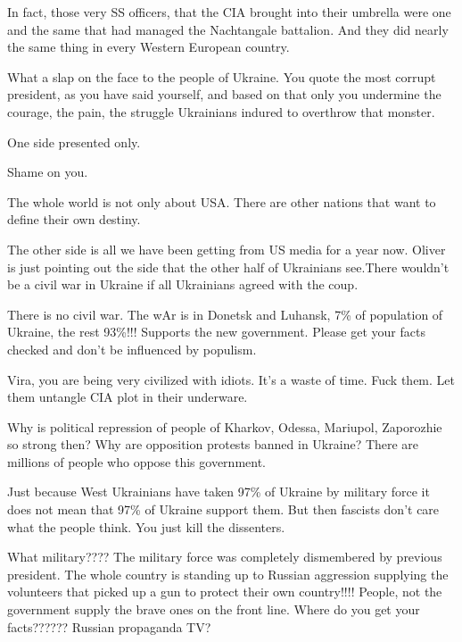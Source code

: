 \begin{itemize}
\begin{itemize}
In fact, those very SS officers, that the CIA brought into their umbrella were
one and the same that had managed the Nachtangale battalion. And they did
nearly the same thing in every Western European country.


\end{itemize} %


What a slap on the face to the people of Ukraine. You quote the most corrupt
president, as you have said yourself, and based on that only you undermine the
courage, the pain, the struggle Ukrainians indured to overthrow that monster.

One side presented only.

Shame on you.

The whole world is not only about USA. There are other nations that want to
define their own destiny.

\begin{itemize} %

The other side is all we have been getting from US media for a year now. Oliver
is just pointing out the side that the other half of Ukrainians see.There
wouldn't be a civil war in Ukraine if all Ukrainians agreed with the coup.



There is no civil war. The wAr is in Donetsk and Luhansk, 7\% of population of
Ukraine, the rest 93\%!!! Supports the new government. Please get your facts
checked and don't be influenced by populism.


Vira, you are being very civilized with idiots. It's a waste of time. Fuck
them. Let them untangle CIA plot in their underware.


Why is political repression of people of Kharkov, Odessa, Mariupol, Zaporozhie
so strong then? Why are opposition protests banned in Ukraine? There are
millions of people who oppose this government.


Just because West Ukrainians have taken 97\% of Ukraine by military force it
does not mean that 97\% of Ukraine support them. But then fascists don't care
what the people think. You just kill the dissenters.


What military???? The military force was completely dismembered by previous
president. The whole country is standing up to Russian aggression supplying the
volunteers that picked up a gun to protect their own country!!!! People, not
the government supply the brave ones on the front line. Where do you get your
facts?????? Russian propaganda TV?


\end{itemize}
\end{itemize}

